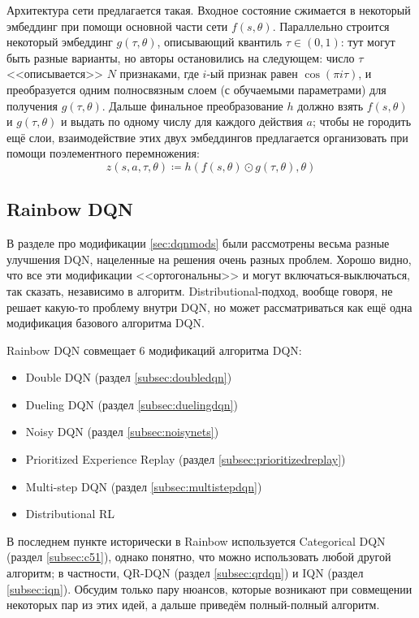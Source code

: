 \begin{remark}
Архитектура сети предлагается такая. Входное состояние сжимается в некоторый эмбеддинг при помощи основной части сети $f(s, \theta)$. Параллельно строится некоторый эмбеддинг $g(\tau, \theta)$, описывающий квантиль $\tau \in (0, 1)$: тут могут быть разные варианты, но авторы остановились на следующем: число $\tau$ <<описывается>> $N$ признаками, где $i$-ый признак равен $\cos(\pi i \tau)$, и преобразуется одним полносвязным слоем (с обучаемыми параметрами) для получения $g(\tau, \theta)$. Дальше финальное преобразование $h$ должно взять $f(s, \theta)$ и $g(\tau, \theta)$ и выдать по одному числу для каждого действия $a$; чтобы не городить ещё слои, взаимодействие этих двух эмбеддингов предлагается организовать при помощи поэлементного перемножения:
$$z(s, a, \tau, \theta) \coloneqq h(f(s, \theta) \odot g(\tau, \theta), \theta)$$
\end{remark}

\subsection{Rainbow DQN}\label{subsec:rainbow}

В разделе про модификации \ref{sec:dqnmods} были рассмотрены весьма разные улучшения DQN, нацеленные на решения очень разных проблем. Хорошо видно, что все эти модификации <<ортогональны>> и могут включаться-выключаться, так сказать, независимо в алгоритм. Distributional-подход, вообще говоря, не решает какую-то проблему внутри DQN, но может рассматриваться как ещё одна модификация базового алгоритма DQN.

Rainbow DQN совмещает 6 модификаций алгоритма DQN:
\begin{itemize}
    \item Double DQN (раздел \ref{subsec:doubledqn})
    \item Dueling DQN (раздел \ref{subsec:duelingdqn})
    \item Noisy DQN  (раздел \ref{subsec:noisynets})
    \item Prioritized Experience Replay (раздел \ref{subsec:prioritizedreplay})
    \item Multi-step DQN (раздел \ref{subsec:multistepdqn})
    \item Distributional RL
\end{itemize}

В последнем пункте исторически в Rainbow используется Categorical DQN (раздел \ref{subsec:c51}), однако понятно, что можно использовать любой другой алгоритм; в частности, QR-DQN (раздел \ref{subsec:qrdqn}) и IQN (раздел \ref{subsec:iqn}). Обсудим только пару нюансов, которые возникают при совмещении некоторых пар из этих идей, а дальше приведём полный-полный алгоритм.

